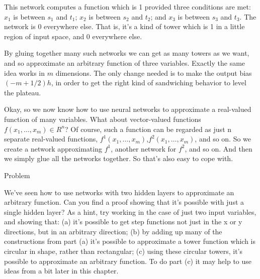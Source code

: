 \documentclass[a4paper,twoside,10pt]{book}
\begin{document}
This network computes a function which is 1 provided three conditions are met: $x_1$ is between $s_1$ and $t_1$; $x_2$ is between $s_2$ and $t_2$; and $x_3$ is between $s_3$ and $t_3$. The network is 0 everywhere else. That is, it's a kind of tower which is 1 in a little region of input space, and 0 everywhere else.

By gluing together many such networks we can get as many towers as we want, and so approximate an arbitrary function of three variables. Exactly the same idea works in $m$ dimensions. The only change needed is to make the output bias $(-m+1/2)h$, in order to get the right kind of sandwiching behavior to level the plateau.

Okay, so we now know how to use neural networks to approximate a real-valued function of many variables. What about vector-valued functions $f(x_1,\ldots,x_m)\in R^n$? Of course, such a function can be regarded as just n separate real-valued functions, $f^1(x_1,\ldots,x_m)$,$f^2(x_1,\ldots,x_m)$, and so on. So we create a network approximating $f^1$, another network for $f^2$, and so on. And then we simply glue all the networks together. So that's also easy to cope with.

\begin{exercize}{Problem}
\item We've seen how to use networks with two hidden layers to approximate an arbitrary function. Can you find a proof showing that it's possible with just a single hidden layer? As a hint, try working in the case of just two input variables, and showing that: (a) it's possible to get step functions not just in the x or y directions, but in an arbitrary direction; (b) by adding up many of the constructions from part (a) it's possible to approximate a tower function which is circular in shape, rather than rectangular; (c) using these circular towers, it's possible to approximate an arbitrary function. To do part (c) it may help to use ideas from a bit later in this chapter.
\end{exercize}
\end{document}
